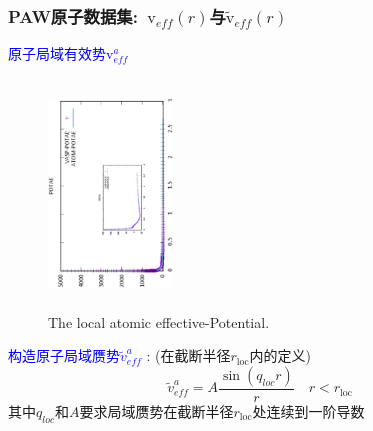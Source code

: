 \documentclass[cjk,slidestop,compress,mathserif,blue]{beamer}
\begin{document}
\frame
{
	\frametitle{\textrm{PAW}原子数据集:~$\mathrm{v}_{e\!f\!f}(r)$与$\tilde{\mathrm{v}}_{e\!f\!f}(r)$}
	\textcolor{blue}{原子局域有效势$\mathrm{v}_{e\!f\!f}^a$}
\begin{figure}[h!]
\vskip -0.1in
\centering
\includegraphics[width=1.3in,height=2.4in,viewport=0 0 700 1200, angle=-90, clip]{Figures/POTAE.eps}
\caption{\tiny \textrm{The local atomic effective-Potential.}}%
\label{local_atomic_PP}
\end{figure}
	\textcolor{blue}{构造原子局域赝势$\tilde v_{e\!f\!f}^a$}%
	:%
	(在截断半径$r_{\mathrm{loc}}$内的定义)
	$$\tilde v_{e\!f\!f}^a=A\dfrac{\sin(q_{loc}r)}r\quad r<r_{\mathrm{loc}}$$
	其中$q_{loc}$和$A$要求局域赝势在截断半径$r_{\mathrm{loc}}$处连续到一阶导数
}
\end{document}
